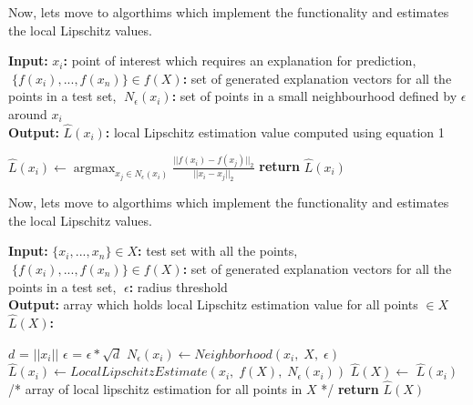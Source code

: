 \documentclass[english]{tktltiki2}
\theoremstyle{definition}
\theoremstyle{remark}
\newcommand{\multicommentsymbolstart}{/*}
\newcommand{\multicommentsymbolend}{*/}
\newcommand{\MultiLineComment}[2][\algorithmicindent]{\Statex \hspace{#1}\multicommentsymbolstart{} #2 \multicommentsymbolend{}}
\newcommand{\onespace}{\;}
\begin{document}
Now, lets move to algorthims which implement the functionality and estimates the local Lipschitz values.
\begin{algorithm}[H]
	\caption{$LocalLipschitzEstimate(x_i,\onespace f(X),\onespace N_\epsilon(x_i))$}
	\hspace*{\algorithmicindent} \textbf{Input}\textbf{:} $x_i$\textbf{:} point of interest which requires an explanation for prediction, $\onespace \{f(x_i),...,f(x_n)\} \in f(X)$\textbf{:} set of generated explanation vectors for all the points in a test set, $\onespace N_\epsilon(x_i)$\textbf{:} set of points in a small neighbourhood defined by $\epsilon$ around $x_i$ \\
	\hspace*{\algorithmicindent} \textbf{Output}\textbf{:} $\hat{L}(x_i)$\textbf{:} local Lipschitz estimation value computed using equation 1
	\begin{algorithmic}[1]
		\State $\hat{L}(x_i) \gets \operatorname*{argmax}_{x_j \in N_\epsilon(x_i)} \frac{||f(x_i) - f(x_j)||_2}{||x_i - x_j||_2}$ 
		\State \textbf{return} $\hat{L}(x_i)$

	\end{algorithmic}
\end{algorithm}

Now, lets move to algorthims which implement the functionality and estimates the local Lipschitz values.
\begin{algorithm}[H]
	\caption{$Main(X,\onespace f(X),\onespace \epsilon)$}
	\hspace*{\algorithmicindent} \textbf{Input}\textbf{:} $\{x_i,...,x_n\} \in X$\textbf{:} test set with all the points, $\onespace \{f(x_i),...,f(x_n)\} \in f(X)$\textbf{:} set of generated explanation vectors for all the points in a test set, $\onespace \epsilon$\textbf{:} radius threshold \\
	\hspace*{\algorithmicindent} \textbf{Output}\textbf{:} array which holds local Lipschitz estimation value for all points $\in X$ $\hat{L}(X)$\textbf{:}
	\begin{algorithmic}[1]
		\State $d$ = $||x_i||$
		\State $\epsilon$ = $\epsilon * \sqrt{d}$ 
			\State $N_{\epsilon}(x_i) \gets Neighborhood(x_i,\; X,\; \epsilon)$
			\State $\hat{L}(x_{i}) \gets LocalLipschitzEstimate(x_i,\; f(X),\; N_\epsilon(x_i))$
			\State $\hat{L}(X) \gets$ $\hat{L}(x_i)$
		\EndFor
		\MultiLineComment[0\dimexpr\algorithmicindent]{array of local lipschitz estimation for all points in $X$}
		\State \textbf{return} $\hat{L}(X)$
	\end{algorithmic}
\end{algorithm}
\end{document}
